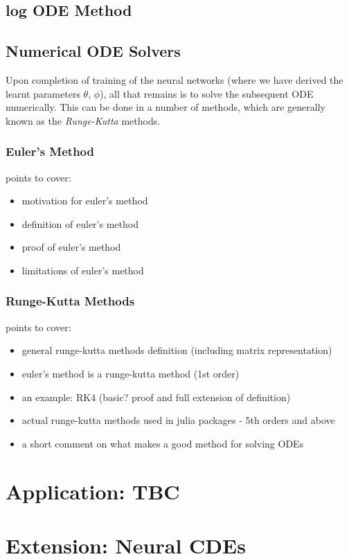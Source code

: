 \documentclass[a4paper,11pt, titlepage]{article}
\theoremstyle{definition}
\theoremstyle{plain}
\theoremstyle{remark}
\begin{document}
\subsection{log ODE Method}

\subsection{Numerical ODE Solvers}
Upon completion of training of the neural networks (where we have derived the learnt parameters $\theta$, $\phi$), all that remains is to solve the subsequent ODE numerically. This can be done in a number of methods, which are generally known as the \textit{Runge-Kutta} methods.

\subsubsection{Euler's Method}
points to cover:
\begin{itemize}
    \item motivation for euler's method
    \item definition of euler's method
    \item proof of euler's method
    \item limitations of euler's method
\end{itemize}

\subsubsection{Runge-Kutta Methods}
points to cover:
\begin{itemize}
    \item general runge-kutta methods definition (including matrix representation)
    \item euler's method is a runge-kutta method (1st order)
    \item an example: RK4 (basic? proof and full extension of definition)
    \item actual runge-kutta methods used in julia packages - 5th orders and above  
    \item a short comment on what makes a good method for solving ODEs
\end{itemize}

\section{Application: TBC}

\section{Extension: Neural CDEs}
\end{document}
